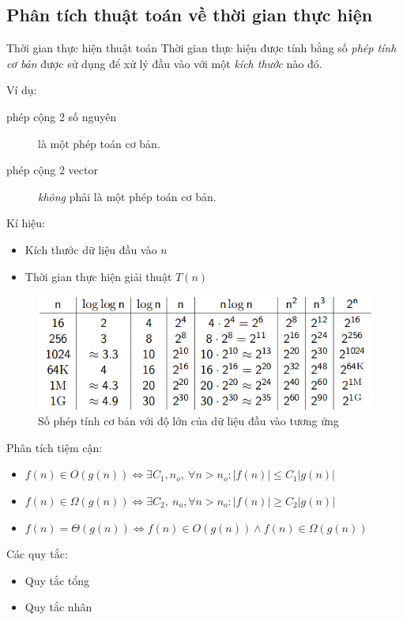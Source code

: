 \documentclass[]{beamer}
\newcommand{\abs}[1]{\left\lvert#1\right\rvert}
\newenvironment{ffr}
               {\begin{frame}{\subsecname}}
               {\end{frame}}
\begin{document}
\begin{ffr}
\subsection{Phân tích thuật toán về thời gian thực hiện}
\begin{ffr}
  \begin{block}{Thời gian thực hiện thuật toán}
  Thời gian thực hiện được tính bằng số {\it phép tính cơ bản} được sử dụng để xử lý đầu vào với một {\it kích thước} nào đó.
  \end{block}\medskip{}
  Ví dụ:
  \begin{description}
  \item[phép cộng 2 số nguyên] là một phép toán cơ bản.
  \item[phép cộng 2 vector] {\it không} phải là một phép toán cơ bản.
  \end{description}
  Kí hiệu:
  \begin{itemize}
  \item Kích thước dữ liệu đầu vào $n$
  \item Thời gian thực hiện giải thuật $T(n)$
  \end{itemize}
\end{ffr}

\begin{ffr}
  \begin{figure}[ht]
    \centering
    \includegraphics[width=\textwidth]{complex.png}
    \caption{\label{fig:label} Số phép tính cơ bản với độ lớn của dữ liệu đầu vào tương ứng}
  \end{figure}
\end{ffr}

\begin{ffr}
  Phân tích tiệm cận:
  \begin{itemize}
  \item $f(n) \in O(g(n)) \iff \exists C_1,n_o,\ \forall n > n_o: \abs{f(n)} \le C_1 \abs{g(n)}$
  \item $f(n) \in \Omega(g(n)) \iff \exists C_2,\ n_o, \forall n > n_o: \abs{f(n)} \ge C_2 \abs{g(n)}$
  \item $f(n) = \Theta(g(n)) \iff f(n) \in O(g(n)) \land f(n) \in \Omega(g(n))$ 
  \end{itemize}
  Các quy tắc:
  \begin{itemize}
  \item Quy tắc tổng
  \item Quy tắc nhân
  \end{itemize}
\end{ffr}


\end{ffr}
\end{document}
